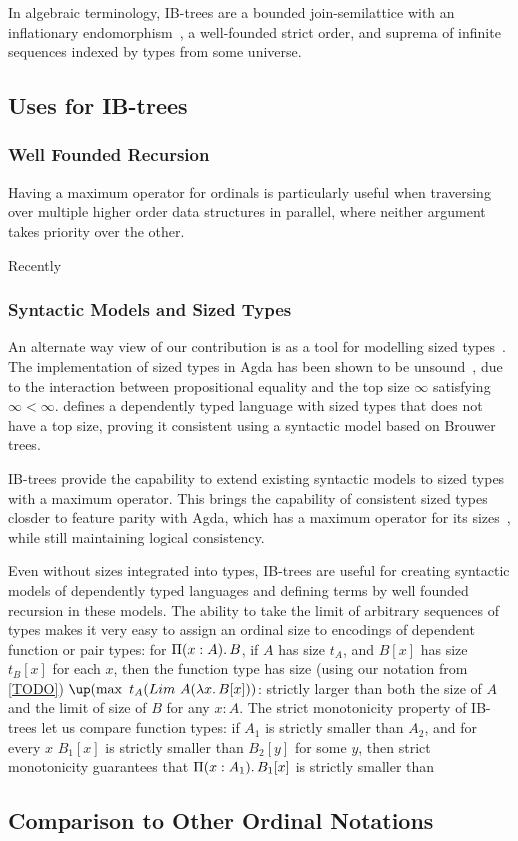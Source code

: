In algebraic terminology, IB-trees are a bounded join-semilattice with an inflationary
endomorphism~\citep{TODO}, a well-founded strict order, and suprema of infinite sequences indexed by types from some universe.

\subsection{Uses for IB-trees}

\subsubsection{Well Founded Recursion}

Having a maximum operator for ordinals is particularly useful when traversing over multiple higher order
data structures in parallel, where neither argument takes priority over the other.

Recently

\subsubsection{Syntactic Models and Sized Types}

An alternate way view of our contribution is as a tool for modelling sized types~\citep{TODO}.
The implementation of sized types in Agda has been shown to be unsound~\citep{TODO}, due to the interaction
between propositional equality and the top size $\infty$ satisfying $\infty < \infty$.
 defines a dependently typed language with sized types that does not have a top size, proving it consistent
using a syntactic model based on Brouwer trees.

IB-trees provide the capability to extend existing syntactic models to sized types
with a maximum operator.
This brings the capability of consistent sized types closder to feature parity with Agda,
which has a maximum operator for its sizes~\citep{TODO}, while still maintaining logical consistency.

Even without sizes integrated into types, IB-trees are useful for creating syntactic models of dependently typed languages and defining terms by well founded recursion in these models.
The ability to take the limit of arbitrary sequences of types makes it very easy to assign an ordinal size
to encodings of dependent function or pair types: for $\Pi(x : A)\ldotp B$, if  $A$ has size $t_{A}$,
and $B[x]$ has size $t_{B}[x]$ for each $x$, then the function type has size (using our notation from \cref{TODO})
$\up (\max\ t_{A} (Lim\ A (\lambda x \ldotp B[x]))$:
strictly larger than both the size of $A$ and the
limit of size of $B$ for any $x : A$.
The strict monotonicity property of IB-trees let us compare function types:
if $A_{1}$ is strictly smaller than $A_{2}$, and for every $x$ $B_{1}[x]$ is strictly smaller than $B_{2}[y]$ for some $y$, then strict monotonicity guarantees that $\Pi(x:A_{1})\ldotp B_{1}[x]$
is strictly smaller than $$
\subsection{Comparison to Other Ordinal Notations}
